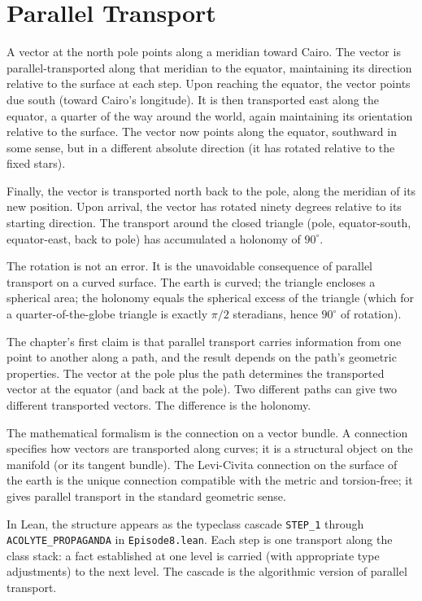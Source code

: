 \section{Parallel Transport}
\label{se:parallel-transport}

A vector at the north pole points along a meridian toward Cairo. The
vector is parallel-transported along that meridian to the equator,
maintaining its direction relative to the surface at each step. Upon
reaching the equator, the vector points due south (toward Cairo's
longitude). It is then transported east along the equator, a
quarter of the way around the world, again maintaining its
orientation relative to the surface. The vector now points along the
equator, southward in some sense, but in a different absolute
direction (it has rotated relative to the fixed stars).

Finally, the vector is transported north back to the pole, along the
meridian of its new position. Upon arrival, the vector has rotated
ninety degrees relative to its starting direction. The transport
around the closed triangle (pole, equator-south, equator-east,
back to pole) has accumulated a holonomy of $90^\circ$.

The rotation is not an error. It is the unavoidable consequence of
parallel transport on a curved surface. The earth is curved; the
triangle encloses a spherical area; the holonomy equals the
spherical excess of the triangle (which for a quarter-of-the-globe
triangle is exactly $\pi/2$ steradians, hence $90^\circ$ of
rotation).

The chapter's first claim is that parallel transport carries
information from one point to another along a path, and the result
depends on the path's geometric properties. The vector at the pole
plus the path determines the transported vector at the equator
(and back at the pole). Two different paths can give two different
transported vectors. The difference is the holonomy.

The mathematical formalism is the connection on a vector bundle. A
connection specifies how vectors are transported along curves; it
is a structural object on the manifold (or its tangent bundle).
The Levi-Civita connection on the surface of the earth is the
unique connection compatible with the metric and torsion-free; it
gives parallel transport in the standard geometric sense.

In Lean, the structure appears as the typeclass cascade
\texttt{STEP\_1} through \texttt{ACOLYTE\_PROPAGANDA} in
\texttt{Episode8.lean}. Each step is one transport along the
class stack: a fact established at one level is carried (with
appropriate type adjustments) to the next level. The cascade is
the algorithmic version of parallel transport.

